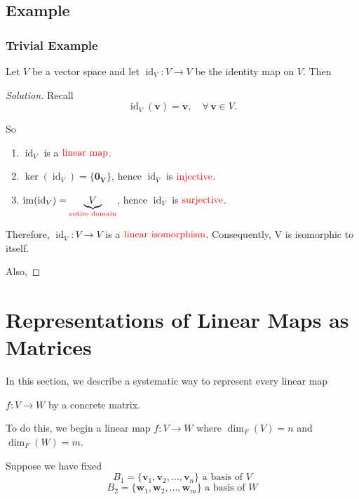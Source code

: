 \documentclass[12pt]{article}
\newenvironment{solution}
{\begin{proof}[Solution]}
{\end{proof}}
\begin{document}
\subsection{Example}

\subsubsection{Trivial Example}

Let $V$ be a vector space and let $\operatorname{id}_V:V\to V$ be the identity map on $V$. Then

\begin{solution}
Recall
\[
\operatorname{id}_V(\mathbf{v})=\mathbf{v},\quad \forall\,\mathbf{v}\in V.
\]

So

\begin{enumerate}
    \item $\operatorname{id}_V$ is a $\textcolor{red}{\text{linear map}}$.

    \item $\ker(\operatorname{id}_V)=\{\mathbf{0_V}\}$, hence $\operatorname{id}_V$ is $\textcolor{red}{\text{injective}}$.

    \item $\operatorname{im}(\operatorname{id}_V)=\underbrace{V}_{\textcolor{red}{\text{entire domain}}}$, hence $\operatorname{id}_V$ is $\textcolor{red}{\text{surjective}}$.
\end{enumerate}

Therefore, $\operatorname{id}_V:V\to V$ is a $\textcolor{red}{\text{linear isomorphism}}$. Consequently, V is isomorphic to itself.

Also, 

\end{solution}

\section{Representations of Linear Maps as Matrices}

In this section, we describe a systematic way to represent every linear map 

$f:V\to W$ by a concrete matrix.

To do this, we begin a linear map $f:V\to W$ where $\dim_F(V)=n$ and $\dim_F(W)=m$.

Suppose we have fixed\
\[
B_1=\{\mathbf{v}_1,\mathbf{v}_2,\ldots,\mathbf{v}_n\} \text{ a basis of $V$}
\]
\[
B_2=\{\mathbf{w}_1,\mathbf{w}_2,\ldots,\mathbf{w}_m\} \text{ a basis of $W$}
\]
\end{document}
